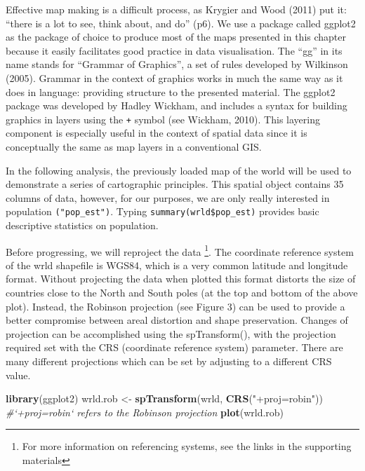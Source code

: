 \documentclass[]{article}
\newenvironment{Shaded}{}{}
\newcommand{\KeywordTok}[1]{\textcolor[rgb]{0.00,0.44,0.13}{\textbf{{#1}}}}
\newcommand{\StringTok}[1]{\textcolor[rgb]{0.25,0.44,0.63}{{#1}}}
\newcommand{\CommentTok}[1]{\textcolor[rgb]{0.38,0.63,0.69}{\textit{{#1}}}}
\newcommand{\NormalTok}[1]{{#1}}
\begin{document}
Effective map making is a difficult process, as Krygier and Wood (2011)
put it: ``there is a lot to see, think about, and do'' (p6). We use a
package called ggplot2 as the package of choice to produce most of the
maps presented in this chapter because it easily facilitates good
practice in data visualisation. The ``gg'' in its name stands for
``Grammar of Graphics'', a set of rules developed by Wilkinson (2005).
Grammar in the context of graphics works in much the same way as it does
in language: providing structure to the presented material. The
ggplot2 package was developed by Hadley Wickham, and includes a syntax for
building graphics in layers using the \texttt{+} symbol (see Wickham,
2010). This layering component is especially useful in the context of
spatial data since it is conceptually the same as map layers in a
conventional GIS.

In the following analysis, the previously loaded map of the world will be used to
demonstrate a series of cartographic principles. This spatial object contains 35
columns of data, however, for our purposes, we are only really interested
in population \texttt{("pop\_est")}. Typing
\texttt{summary(wrld\$pop\_est)} provides basic descriptive statistics
on population.

Before progressing, we will reproject the data \footnote{For more information on referencing systems, see the links in the supporting materials}.
The coordinate reference system of the wrld
shapefile is WGS84, which is a very common latitude and longitude
format. Without projecting the data when plotted this format distorts
the size of countries close to the North and South poles (at the top and
bottom of the above plot). Instead, the
Robinson projection (see Figure 3) can be used to provide a better compromise between areal distortion
and shape preservation. Changes of projection can be accomplished using the spTransform(), with the projection required set with the CRS (coordinate reference system) parameter. 
There are many different projections which can be set by adjusting to a different CRS value. 

\begin{Shaded}
\begin{Highlighting}[]
\KeywordTok{library}\NormalTok{(ggplot2)}
\NormalTok{wrld.rob <- }\KeywordTok{spTransform}\NormalTok{(wrld, }\KeywordTok{CRS}\NormalTok{(}\StringTok{"+proj=robin"}\NormalTok{))  }\CommentTok{#`+proj=robin` refers to the Robinson projection}
\KeywordTok{plot}\NormalTok{(wrld.rob)}
\end{Highlighting}
\end{Shaded}
\end{document}
